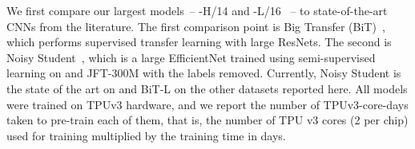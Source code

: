 We first compare our largest models~-- \oursabbrv-H/14 and \oursabbrv-L/16 ~-- to state-of-the-art CNNs from the literature.
The first comparison point is Big Transfer (BiT)~\citep{kolesnikov2020-bit}, which performs supervised transfer learning with large ResNets.
The second is Noisy Student~\citep{xie2020-noisystudent},
which is a large EfficientNet trained using semi-supervised learning on \imagenet and JFT-300M with the labels removed.
Currently, Noisy Student is the state of the art on \imagenet and BiT-L on the other datasets reported here.
All models were trained on TPUv3 hardware, and we report the number of TPUv3-core-days taken to pre-train each of them, that is, the number of TPU v3 cores (2 per chip) used for training multiplied by the training time in days.

\begin{table}[t]
\centering
{}
\end{table}
